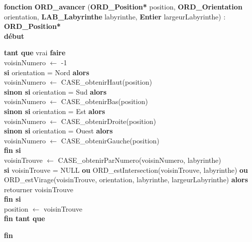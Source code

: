 \documentclass[a4paper, 11pt]{article}
\begin{document}
\noindent\textbf{fonction} \textbf{ORD\_avancer} (\textbf{ORD\_Position*} position, \textbf{ORD\_Orientation} orientation, \textbf{LAB\_Labyrinthe} labyrinthe, \textbf{Entier} largeurLabyrinthe) : \textbf{ORD\_Position*}\\
\textbf{début}
\begin{flushleft}
    \hspace*{1cm}\textbf{tant que} vrai \textbf{faire}\\
    \hspace*{2cm}voisinNumero $\gets$ -1\\
    \hspace*{2cm}\textbf{si} orientation = Nord \textbf{alors}\\
    \hspace*{3cm}voisinNumero $\gets$ CASE\_obtenirHaut(position)\\
    \hspace*{2cm}\textbf{sinon si} orientation = Sud \textbf{alors}\\
    \hspace*{3cm}voisinNumero $\gets$ CASE\_obtenirBas(position)\\
    \hspace*{2cm}\textbf{sinon si} orientation = Est \textbf{alors}\\
    \hspace*{3cm}voisinNumero $\gets$ CASE\_obtenirDroite(position)\\
    \hspace*{2cm}\textbf{sinon si} orientation = Ouest \textbf{alors}\\
    \hspace*{3cm}voisinNumero $\gets$ CASE\_obtenirGauche(position)\\
    \hspace*{2cm}\textbf{fin si}\\
    \hspace*{2cm}voisinTrouve $\gets$ CASE\_obtenirParNumero(voisinNumero, labyrinthe)\\
    \hspace*{2cm}\textbf{si} voisinTrouve = NULL \textbf{ou} ORD\_estIntersection(voisinTrouve, labyrinthe) \textbf{ou}\\
    \hspace*{2cm}ORD\_estVirage(voisinTrouve, orientation, labyrinthe, largeurLabyrinthe) \textbf{alors}\\
    \hspace*{3cm}retourner voisinTrouve\\
    \hspace*{2cm}\textbf{fin si}\\
    \hspace*{2cm}position $\gets$ voisinTrouve\\
    \hspace*{1cm}\textbf{fin tant que}
\end{flushleft}
\textbf{fin}\\
\end{document}
